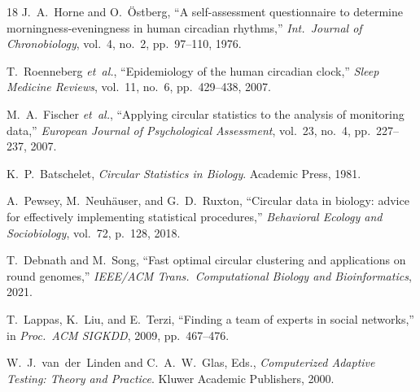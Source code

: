 \documentclass[conference]{IEEEtran}
\begin{document}
\begin{thebibliography}{18}
  J.~A.~Horne and O.~\"{O}stberg,
  ``A self-assessment questionnaire to determine
  morningness-eveningness in human circadian rhythms,''
  \textit{Int.\ Journal of Chronobiology},
  vol.~4, no.~2, pp.~97--110, 1976.

  T.~Roenneberg \textit{et~al.},
  ``Epidemiology of the human circadian clock,''
  \textit{Sleep Medicine Reviews},
  vol.~11, no.~6, pp.~429--438, 2007.

  M.~A.~Fischer \textit{et~al.},
  ``Applying circular statistics to the analysis of monitoring data,''
  \textit{European Journal of Psychological Assessment},
  vol.~23, no.~4, pp.~227--237, 2007.

  K.~P.~Batschelet,
  \textit{Circular Statistics in Biology}.
  Academic Press, 1981.

  A.~Pewsey, M.~Neuh\"{a}user, and G.~D.~Ruxton,
  ``Circular data in biology: advice for effectively implementing
  statistical procedures,''
  \textit{Behavioral Ecology and Sociobiology},
  vol.~72, p.~128, 2018.

  T.~Debnath and M.~Song,
  ``Fast optimal circular clustering and applications on round
  genomes,''
  \textit{IEEE/ACM Trans.\ Computational Biology and Bioinformatics},
  2021.

  T.~Lappas, K.~Liu, and E.~Terzi,
  ``Finding a team of experts in social networks,''
  in \textit{Proc.\ ACM SIGKDD}, 2009, pp.~467--476.

  W.~J.~van~der~Linden and C.~A.~W.~Glas, Eds.,
  \textit{Computerized Adaptive Testing: Theory and Practice}.
  Kluwer Academic Publishers, 2000.

\end{thebibliography}
\end{document}
